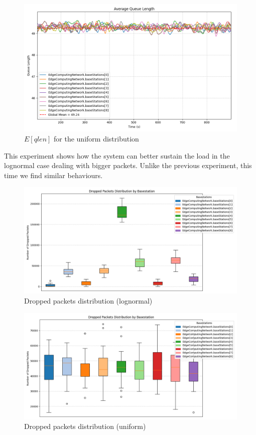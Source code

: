 \documentclass{report}
\begin{document}
\begin{figure}[H]
    \centering
    \includegraphics[width=\textwidth]{img/plots/uni_1e4_A/qlen.png}
    \caption{$E[qlen]$ for the uniform distribution}
\end{figure}

This experiment shows how the system can better sustain the load in the lognormal case dealing with bigger packets. Unlike the previous experiment, this time we find similar behaviours.

\begin{figure}[H]
    \centering
    \includegraphics[width=\textwidth]{img/plots/log_1e4_A/dropped.png}
    \caption{Dropped packets distribution (lognormal)}
\end{figure}

\begin{figure}[H]
    \centering
    \includegraphics[width=\textwidth]{img/plots/uni_1e4_A/dropped.png}
    \caption{Dropped packets distribution (uniform)}
\end{figure}
\end{document}
